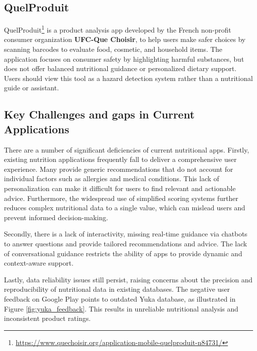 \subsection{QuelProduit}
QuelProduit\footnote{\url{https://www.quechoisir.org/application-mobile-quelproduit-n84731/}} is a product analysis app developed by the French non-profit consumer organization \textbf{UFC-Que Choisir}, to help users make safer choices by scanning barcodes to evaluate food, cosmetic, and household items.
 The application focuses on consumer safety by highlighting harmful substances, but does not offer balanced nutritional guidance or personalized dietary support. Users should view this tool as a hazard detection system rather than a nutritional guide or assistant.
 
\subsection{Key Challenges and gaps in Current Applications}
There are a number of significant deficiencies of current nutritional apps. Firstly, existing nutrition applications frequently fall to deliver a comprehensive user experience. Many provide generic recommendations that do not account for individual factors such as allergies and medical conditions. This lack of personalization can make it difficult for users to find relevant and actionable advice. Furthermore, the widespread use of simplified scoring systems further reduces complex nutritional data to a single value, which can mislead users and prevent informed decision-making.  

Secondly, there is a lack of interactivity, missing real-time guidance via chatbots to answer questions and provide tailored recommendations and advice. The lack of conversational guidance restricts the ability of apps to provide dynamic and context-aware support. 

 Lastly, data reliability issues still persist, raising concerns about the precision and reproducibility of nutritional data in existing databases. The negative user feedback on Google Play points to outdated Yuka database, as illustrated in Figure \ref{fig:yuka_feedback}. This results in unreliable nutritional analysis and inconsistent product ratings.  

